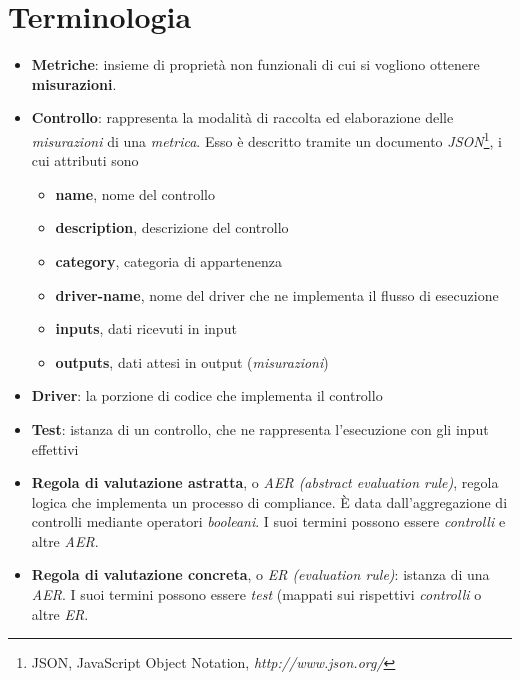 \documentclass[../main.tex]{subfiles}
\begin{document}
\section{Terminologia}
\begin{itemize}
    \item \textbf{Metriche}: insieme di proprietà non funzionali di cui si vogliono ottenere \textbf{misurazioni}.
    \item \textbf{Controllo}: rappresenta la modalità di raccolta ed elaborazione delle \textit{misurazioni} di una \textit{metrica}.
        Esso è descritto tramite un documento \textit{JSON}\footnote{JSON, JavaScript Object Notation, \textit{http://www.json.org/}}, i cui attributi sono
        \begin{itemize}
            \item \textbf{name}, nome del controllo
            \item \textbf{description}, descrizione del controllo
            \item \textbf{category}, categoria di appartenenza
            \item \textbf{driver-name}, nome del driver che ne implementa il flusso di esecuzione
            \item \textbf{inputs}, dati ricevuti in input
            \item \textbf{outputs}, dati attesi in output (\textit{misurazioni})
        \end{itemize}
    \item \textbf{Driver}: la porzione di codice che implementa il controllo 
    \item \textbf{Test}: istanza di un controllo, che ne rappresenta l'esecuzione con gli input effettivi 
    \item \textbf{Regola di valutazione astratta}, o \textit{AER (abstract evaluation rule)}, regola logica che implementa un processo di compliance. È data dall'aggregazione di controlli mediante operatori \textit{booleani}. I suoi termini possono essere \textit{controlli} e altre \textit{AER}.
    \item \textbf{Regola di valutazione concreta}, o \textit{ER (evaluation rule)}: istanza di una \textit{AER}. I suoi termini possono essere \textit{test} (mappati sui rispettivi \textit{controlli} o altre \textit{ER}.
\end{itemize}
\vfill
\newpage
\end{document}
